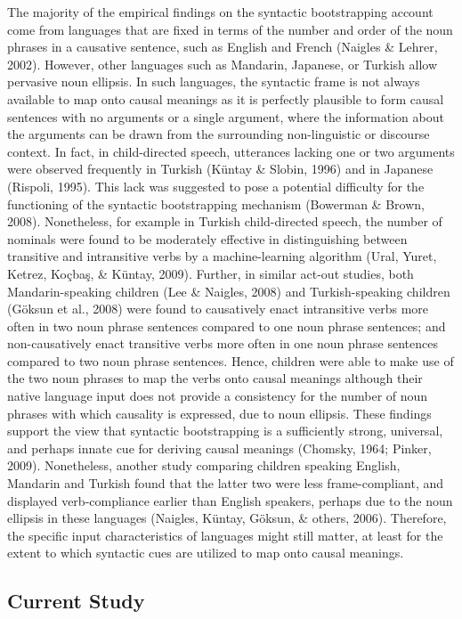 \documentclass[man]{apa6}
\begin{document}
The majority of the empirical findings on the syntactic bootstrapping
account come from languages that are fixed in terms of the number and
order of the noun phrases in a causative sentence, such as English and
French (Naigles \& Lehrer, 2002). However, other languages such as
Mandarin, Japanese, or Turkish allow pervasive noun ellipsis. In such
languages, the syntactic frame is not always available to map onto
causal meanings as it is perfectly plausible to form causal sentences
with no arguments or a single argument, where the information about the
arguments can be drawn from the surrounding non-linguistic or discourse
context. In fact, in child-directed speech, utterances lacking one or
two arguments were observed frequently in Turkish (Küntay \& Slobin,
1996) and in Japanese (Rispoli, 1995). This lack was suggested to pose a
potential difficulty for the functioning of the syntactic bootstrapping
mechanism (Bowerman \& Brown, 2008). Nonetheless, for example in Turkish
child-directed speech, the number of nominals were found to be
moderately effective in distinguishing between transitive and
intransitive verbs by a machine-learning algorithm (Ural, Yuret, Ketrez,
Koçbaş, \& Küntay, 2009). Further, in similar act-out studies, both
Mandarin-speaking children (Lee \& Naigles, 2008) and Turkish-speaking
children (Göksun et al., 2008) were found to causatively enact
intransitive verbs more often in two noun phrase sentences compared to
one noun phrase sentences; and non-causatively enact transitive verbs
more often in one noun phrase sentences compared to two noun phrase
sentences. Hence, children were able to make use of the two noun phrases
to map the verbs onto causal meanings although their native language
input does not provide a consistency for the number of noun phrases with
which causality is expressed, due to noun ellipsis. These findings
support the view that syntactic bootstrapping is a sufficiently strong,
universal, and perhaps innate cue for deriving causal meanings (Chomsky,
1964; Pinker, 2009). Nonetheless, another study comparing children
speaking English, Mandarin and Turkish found that the latter two were
less frame-compliant, and displayed verb-compliance earlier than English
speakers, perhaps due to the noun ellipsis in these languages (Naigles,
Küntay, Göksun, \& others, 2006). Therefore, the specific input
characteristics of languages might still matter, at least for the
extent to which syntactic cues are utilized to map onto causal meanings.

\subsection{Current Study}\label{current-study}
\end{document}
